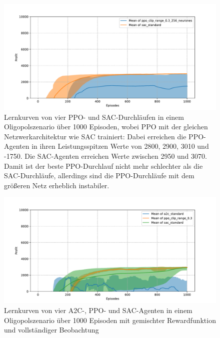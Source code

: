 \begin{figure}[htb]
	\centering
	\includegraphics[width=\textwidth]{appendix/comparison_oligopoly_big_network.pdf}
	\caption{
		Lernkurven von vier PPO- und SAC-Durchläufen in einem Oligopolszenario über 1000 Episoden, wobei PPO mit der gleichen Netzwerkarchitektur wie SAC trainiert:
		Dabei erreichen die PPO-Agenten in ihren Leistungsspitzen Werte von 2800{,} 2900{,} 3010 und -1750.
		Die SAC-Agenten erreichen Werte zwischen 2950 und 3070.
		Damit ist der beste PPO-Durchlauf nicht mehr schlechter als die SAC-Durchläufe, allerdings sind die PPO-Durchläufe mit dem größeren Netz erheblich instabiler.
	}
	\label{graphic:OligopolyMixedComparisonBigNetwork}
\end{figure}
\begin{figure}[htb]
	\centering
	\includegraphics[width=\textwidth]{appendix/comparison_oligopoly_mixed.pdf}
	\caption{Lernkurven von vier A2C-, PPO- und SAC-Agenten in einem Oligopolszenario über 1000 Episoden mit gemischter Rewardfunktion und vollständiger Beobachtung}
	\label{graphic:OligopolyMixedComparison}
\end{figure}